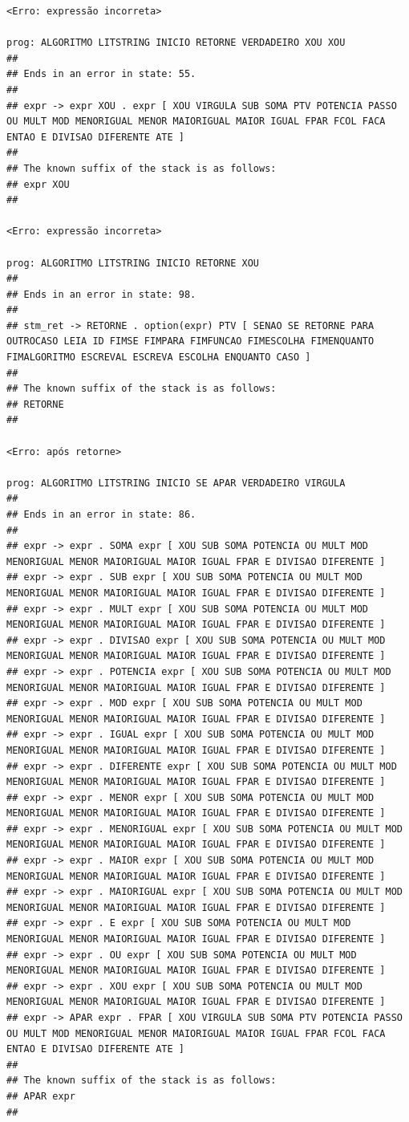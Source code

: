 \documentclass[hidelinks,12pt]{article}
\begin{document}
\begin{lstlisting}
<Erro: expressão incorreta>

prog: ALGORITMO LITSTRING INICIO RETORNE VERDADEIRO XOU XOU 
##
## Ends in an error in state: 55.
##
## expr -> expr XOU . expr [ XOU VIRGULA SUB SOMA PTV POTENCIA PASSO OU MULT MOD MENORIGUAL MENOR MAIORIGUAL MAIOR IGUAL FPAR FCOL FACA ENTAO E DIVISAO DIFERENTE ATE ]
##
## The known suffix of the stack is as follows:
## expr XOU 
##

<Erro: expressão incorreta>

prog: ALGORITMO LITSTRING INICIO RETORNE XOU 
##
## Ends in an error in state: 98.
##
## stm_ret -> RETORNE . option(expr) PTV [ SENAO SE RETORNE PARA OUTROCASO LEIA ID FIMSE FIMPARA FIMFUNCAO FIMESCOLHA FIMENQUANTO FIMALGORITMO ESCREVAL ESCREVA ESCOLHA ENQUANTO CASO ]
##
## The known suffix of the stack is as follows:
## RETORNE 
##

<Erro: após retorne>

prog: ALGORITMO LITSTRING INICIO SE APAR VERDADEIRO VIRGULA 
##
## Ends in an error in state: 86.
##
## expr -> expr . SOMA expr [ XOU SUB SOMA POTENCIA OU MULT MOD MENORIGUAL MENOR MAIORIGUAL MAIOR IGUAL FPAR E DIVISAO DIFERENTE ]
## expr -> expr . SUB expr [ XOU SUB SOMA POTENCIA OU MULT MOD MENORIGUAL MENOR MAIORIGUAL MAIOR IGUAL FPAR E DIVISAO DIFERENTE ]
## expr -> expr . MULT expr [ XOU SUB SOMA POTENCIA OU MULT MOD MENORIGUAL MENOR MAIORIGUAL MAIOR IGUAL FPAR E DIVISAO DIFERENTE ]
## expr -> expr . DIVISAO expr [ XOU SUB SOMA POTENCIA OU MULT MOD MENORIGUAL MENOR MAIORIGUAL MAIOR IGUAL FPAR E DIVISAO DIFERENTE ]
## expr -> expr . POTENCIA expr [ XOU SUB SOMA POTENCIA OU MULT MOD MENORIGUAL MENOR MAIORIGUAL MAIOR IGUAL FPAR E DIVISAO DIFERENTE ]
## expr -> expr . MOD expr [ XOU SUB SOMA POTENCIA OU MULT MOD MENORIGUAL MENOR MAIORIGUAL MAIOR IGUAL FPAR E DIVISAO DIFERENTE ]
## expr -> expr . IGUAL expr [ XOU SUB SOMA POTENCIA OU MULT MOD MENORIGUAL MENOR MAIORIGUAL MAIOR IGUAL FPAR E DIVISAO DIFERENTE ]
## expr -> expr . DIFERENTE expr [ XOU SUB SOMA POTENCIA OU MULT MOD MENORIGUAL MENOR MAIORIGUAL MAIOR IGUAL FPAR E DIVISAO DIFERENTE ]
## expr -> expr . MENOR expr [ XOU SUB SOMA POTENCIA OU MULT MOD MENORIGUAL MENOR MAIORIGUAL MAIOR IGUAL FPAR E DIVISAO DIFERENTE ]
## expr -> expr . MENORIGUAL expr [ XOU SUB SOMA POTENCIA OU MULT MOD MENORIGUAL MENOR MAIORIGUAL MAIOR IGUAL FPAR E DIVISAO DIFERENTE ]
## expr -> expr . MAIOR expr [ XOU SUB SOMA POTENCIA OU MULT MOD MENORIGUAL MENOR MAIORIGUAL MAIOR IGUAL FPAR E DIVISAO DIFERENTE ]
## expr -> expr . MAIORIGUAL expr [ XOU SUB SOMA POTENCIA OU MULT MOD MENORIGUAL MENOR MAIORIGUAL MAIOR IGUAL FPAR E DIVISAO DIFERENTE ]
## expr -> expr . E expr [ XOU SUB SOMA POTENCIA OU MULT MOD MENORIGUAL MENOR MAIORIGUAL MAIOR IGUAL FPAR E DIVISAO DIFERENTE ]
## expr -> expr . OU expr [ XOU SUB SOMA POTENCIA OU MULT MOD MENORIGUAL MENOR MAIORIGUAL MAIOR IGUAL FPAR E DIVISAO DIFERENTE ]
## expr -> expr . XOU expr [ XOU SUB SOMA POTENCIA OU MULT MOD MENORIGUAL MENOR MAIORIGUAL MAIOR IGUAL FPAR E DIVISAO DIFERENTE ]
## expr -> APAR expr . FPAR [ XOU VIRGULA SUB SOMA PTV POTENCIA PASSO OU MULT MOD MENORIGUAL MENOR MAIORIGUAL MAIOR IGUAL FPAR FCOL FACA ENTAO E DIVISAO DIFERENTE ATE ]
##
## The known suffix of the stack is as follows:
## APAR expr 
##


\end{lstlisting}
\end{document}
